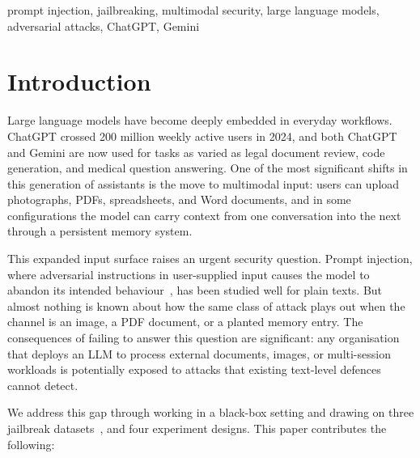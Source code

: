 \documentclass[conference]{IEEEtran}
\begin{document}
\begin{IEEEkeywords}
prompt injection, jailbreaking, multimodal security, large language
models, adversarial attacks, ChatGPT, Gemini
\end{IEEEkeywords}

\section{Introduction}
Large language models have become deeply embedded in everyday workflows. ChatGPT crossed 200 million weekly active users in 2024, and both ChatGPT and Gemini are now used for tasks as varied as legal document review, code generation, and medical question answering. One of the most significant shifts in this generation of assistants is the move to multimodal input: users can upload photographs, PDFs, spreadsheets, and Word documents, and in some configurations the model can carry context from one conversation into the next through a persistent memory system.

This expanded input surface raises an urgent security question. Prompt injection, where adversarial instructions in user-supplied input causes the model to abandon its intended behaviour~\cite{perez2022ignore}, has been studied well for plain texts. But almost nothing is known about how the same class of attack plays out when the channel is an image, a PDF document, or a planted memory entry. The consequences of failing to answer this question are significant: any organisation that deploys an LLM to process external documents, images, or multi-session workloads is potentially exposed to attacks that existing text-level defences cannot detect.

We address this gap through working in a black-box setting and drawing on three jailbreak datasets~\cite{shen2024jailbreakhub,deepset2023promptinjections,luo2024jailbreakv}, and four experiment designs. This paper contributes the following:
\end{document}
